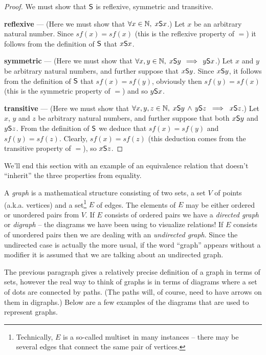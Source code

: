 \begin{proof}
We must show that $\mbox{\textsf S}$ is reflexive, symmetric and transitive.

{\bf reflexive} --- (Here we must show that $\forall x \in {\mathbb N}, \; x \mbox{\textsf S} x$.)
Let $x$ be an arbitrary natural number.  Since $sf(x) = sf(x)$ (this is the reflexive 
property of $=$) it follows from the definition of $\mbox{\textsf S}$ that $x \mbox{\textsf S} x$.

{\bf symmetric} --- (Here we must show that  $\forall x,y \in {\mathbb N}, \; x \mbox{\textsf S} y \, 
\implies \, y \mbox{\textsf S} x$.)
Let $x$ and $y$ be arbitrary natural numbers, and further suppose that $x \mbox{\textsf S} y$. 
Since $x \mbox{\textsf S} y$, it follows from the definition of $\mbox{\textsf S}$ that $sf(x) = sf(y)$,
obviously then $sf(y) = sf(x)$ (this is the symmetric property of $=$) and so 
$y \mbox{\textsf S} x$.

{\bf transitive} --- (Here we must show that  $\forall x,y,z \in {\mathbb N}, \; x \mbox{\textsf S} y \,
\land \, y \mbox{\textsf S} z \; \implies \; x \mbox{\textsf S} z$.)
Let $x$, $y$ and $z$ be arbitrary natural numbers, and further suppose that both 
$x \mbox{\textsf S} y$ and $y \mbox{\textsf S} z$.  From the definition of $\mbox{\textsf S}$ we deduce that 
$sf(x) = sf(y)$ and $sf(y) = sf(z)$.  Clearly, $sf(x) = sf(z)$ (this deduction comes
from the transitive property of $=$), so $x \mbox{\textsf S} z$.

\end{proof}
 
We'll end this section with an example of an equivalence relation that
doesn't ``inherit'' the three properties from equality.  

A  \emph{graph} is a mathematical structure consisting of
two sets, a set $V$ of points (a.k.a. vertices) and a set\footnote{Technically, $E$ is a so-called
multiset in many instances -- there may be several edges that connect the same pair of vertices.} $E$ of edges.
The elements of $E$ may be either ordered or unordered pairs from $V$. 
If $E$ consists of ordered pairs we have a  
\emph{directed graph} or \emph{digraph} -- the diagrams we have been using to visualize
relations!  If $E$ consists of unordered 
pairs then we are dealing with an \emph{undirected graph}.  Since the
undirected case is actually the more usual, if the word ``graph'' appears without
a modifier it is assumed that we are talking about an undirected graph.

The previous paragraph gives a relatively precise definition of a graph
in terms of sets, however the real way to think of graphs is in terms
of diagrams where a set of dots are connected by paths.  (The paths will, 
of course, need to
have arrows on them in digraphs.)  Below are a few examples of the 
diagrams that are used to represent graphs.

